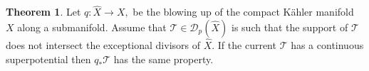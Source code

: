 \documentclass[11pt]{amsart}
\theoremstyle{definition}
\newtheorem{theorem}{Theorem}[section]
\newcommand{\lto}{\longrightarrow}
\newcommand{\sD}{\mathscr{D}}
\newcommand{\sT}{\mathscr{T}}
\begin{document}
\begin{theorem}\label{thm:CS-blowup}
  Let $q: \widehat{X} \lto X,$ be the blowing up of the compact K\"ahler manifold $X$ along a submanifold. Assume that $\sT \in \sD_p(\widehat{X})$ is such that the support of $\sT$ does not intersect the exceptional divisors of $\widehat{X}.$ If   the   current $\sT$ has a continuous superpotential then $q_* \sT$ has the same property. 
\end{theorem}
\end{document}
